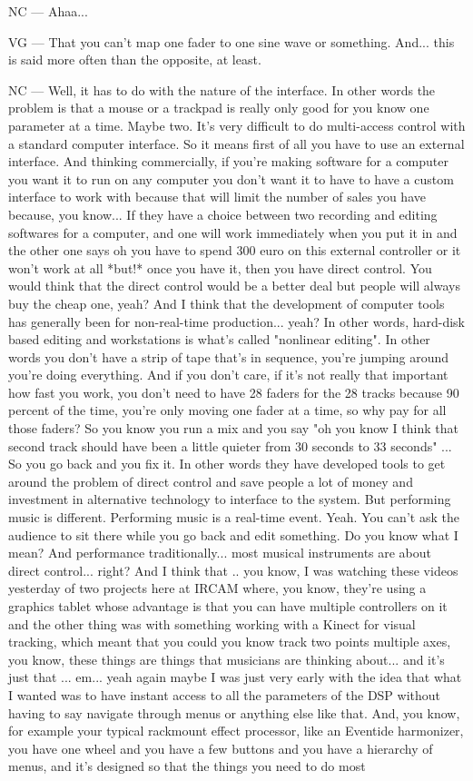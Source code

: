 NC — Ahaa... 

VG — That you can't map one fader to one sine wave or something. And... this is said more often than the opposite, at least. 

NC — Well, it has to do with the nature of the interface. In other words the problem is that a mouse or a trackpad is really only good for you know one parameter at a time. Maybe two. It's very difficult to do multi-access control with a standard computer interface. So it means first of all you have to use an external interface. And thinking commercially, if you're making software for a computer you want it to run on any computer you don't want it to have to have a custom interface to work with because that will limit the number of sales you have because, you know... If they have a choice between two recording and editing softwares for a computer, and one will work immediately when you put it in and the other one says oh you have to spend 300 euro on this external controller or it won't work at all *but!* once you have it, then you have direct control. You would think that the direct control would be a better deal but people will always buy the cheap one, yeah? And I think that the development of computer tools has generally been for non-real-time  production... yeah? In other words, hard-disk based editing and workstations is what's called "nonlinear editing". In other words you don't have a strip of tape that's in sequence, you're jumping around you're doing everything. And if you don't care, if it's not really that important how fast you work, you don't need to have 28 faders for the 28 tracks because 90 percent of the time, you're only moving one fader at a time, so why pay for all those faders? So you know you run a mix and you say "oh you know I think that second track should have been a little quieter from 30 seconds to 33 seconds" ... So you go back and you fix it. In other words they have developed tools to get around the problem of direct control and save people a lot of money and investment in alternative technology to interface to the system. But performing music is different. Performing music is a real-time event. Yeah. You can't ask the audience to sit there while you go back and edit something. Do you know what I mean? And performance traditionally... most musical instruments are about direct control... right? And I think that .. you know, I was watching these videos yesterday of two projects here at IRCAM where, you know, they're using a graphics tablet whose advantage is that you can have multiple controllers on it and the other thing was with something working with a Kinect for visual tracking, which meant that you could you know track two points multiple axes, you know, these things are things that musicians are thinking about... and it's just that ... em... yeah again maybe I was just very early with the idea that what I wanted was to have instant access to all the parameters of the DSP without having to say navigate through menus or anything else like that. And, you know, for example your typical rackmount effect processor, like an Eventide harmonizer, you have one wheel and you have a few buttons and you have a hierarchy of menus, and it's designed so that the things you need to do most 